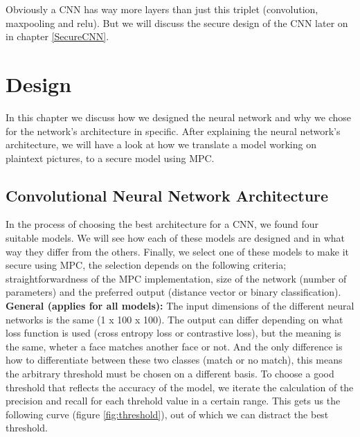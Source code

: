 Obviously a CNN has way more layers than just this triplet (convolution, maxpooling and relu). But we will discuss the secure design of the CNN later on in chapter \ref{SecureCNN}.

\section{Design}
\label{Design}
In this chapter we discuss how we designed the neural network and why we chose for the network's architecture in specific. After explaining the neural network's architecture, we will have a look at how we translate a model working on plaintext pictures, to a secure model using MPC.

\subsection{Convolutional Neural Network Architecture}
\label{ConvolutionalNeuralNetworkArchitecture}
In the process of choosing the best architecture for a CNN, we found four suitable models. We will see how each of these models are designed and in what way they differ from the others. Finally, we select one of these models to make it secure using MPC, the selection depends on the following criteria; straightforwardness of the MPC implementation, size of the network (number of parameters) and the preferred output (distance vector or binary classification).\\

\textbf{General (applies for all models):} The input dimensions of the different neural networks is the same (1 x 100 x 100). The output can differ depending on what loss function is used (cross entropy loss or contrastive loss), but the meaning is the same, wheter a face matches another face or not. And the only difference is how to differentiate between these two classes (match or no match), this means the arbitrary threshold must be chosen on a different basis. To choose a good threshold that reflects the accuracy of the model, we iterate the calculation of the precision and recall for each threhold value in a certain range. This gets us the following curve (figure \ref{fig:threshold}), out of which we can distract the best threshold.\\

